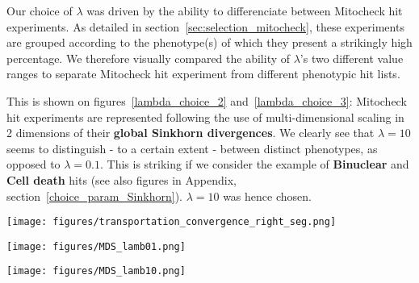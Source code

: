 Our choice of $\lambda$ was driven by the ability to differenciate between Mitocheck hit experiments. As detailed in section~\ref{sec:selection_mitocheck}, these experiments are grouped according to the phenotype(s) of which they present a strikingly high percentage. We therefore visually compared the ability of $\lambda$'s two different value ranges to separate Mitocheck hit experiment from different phenotypic hit lists. 

This is shown on figures~\ref{lambda_choice_2} and~\ref{lambda_choice_3}: Mitocheck hit experiments are represented following the use of multi-dimensional scaling in 2 dimensions of their \textbf{global Sinkhorn divergences}. We clearly see that $\lambda=10$ seems to distinguish - to a certain extent - between distinct phenotypes, as opposed to $\lambda=0.1$. This is striking if we consider the example of \textbf{Binuclear} and \textbf{Cell death} hits (see also figures in Appendix, section~\ref{choice_param_Sinkhorn}). $\lambda=10$ was hence chosen.

\begin{figure*}[ht!]
\centerline{\texttt{[image: figures/transportation\_convergence\_right\_seg.png]}
}
\caption{Convergence of Sinkhorn divergence as a function of lambda. Divergences were computed between drug screen experiments and Mitocheck hit experiments for different values of lambda, and the distribution of their relative variation to the divergences computed for $\lambda=30$ are showed here.}
\label{lambda_choice1}
\end{figure*}
\begin{figure*}[ht!]
\centerline{
\texttt{[image: figures/MDS\_lamb01.png]}
}
\caption{Separation between Mitocheck hit categories (left) for $\lambda=0.1$. Global Sinkhorn divergences between Mitocheck hit experiments were computed for $\lambda=0.1$, and multi-dimensional scaling was used for representing them in two dimensions in the first two lines. Divergences between these experiments and the drug screen were included and their multi-dimension scaling is shown on the right plot.}
\label{lambda_choice_2}
\end{figure*}
\begin{figure*}[ht!]
\centerline{
\texttt{[image: figures/MDS\_lamb10.png]}}
\caption{Separation between Mitocheck hit categories (left) for $\lambda=10$. Global Sinkhorn divergences between Mitocheck hit experiments were computed for $\lambda=10$, and multi-dimensional scaling was used for representing them in two dimensions in the first two lines. Divergences between these experiments and the drug screen were included and their multi-dimension scaling is shown on the right plot.}
\label{lambda_choice_3}
\end{figure*}

